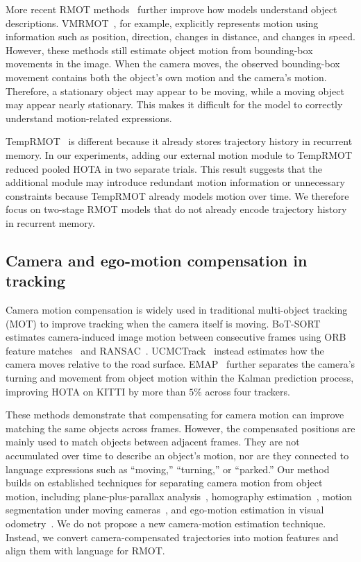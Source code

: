 \documentclass[sigconf,anonymous,nonacm]{acmart}
\begin{document}
More recent RMOT methods~\cite{mlstrack,deeprmot,cdrmot,tellmewhat} further improve how models understand object descriptions. VMRMOT~\cite{vmrmot}, for example, explicitly represents motion using information such as position, direction, changes in distance, and changes in speed. However, these methods still estimate object motion from bounding-box movements in the image. When the camera moves, the observed bounding-box movement contains both the object’s own motion and the camera’s motion. Therefore, a stationary object may appear to be moving, while a moving object may appear nearly stationary. This makes it difficult for the model to correctly understand motion-related expressions.

TempRMOT~\cite{temprmot} is different because it already stores trajectory history in recurrent memory. In our experiments, adding our external motion module to TempRMOT reduced pooled HOTA in two separate trials. This result suggests that the additional module may introduce redundant motion information or unnecessary constraints because TempRMOT already models motion over time. We therefore focus on two-stage RMOT models that do not already encode trajectory history in recurrent memory.

\subsection{Camera and ego-motion compensation in tracking}

Camera motion compensation is widely used in traditional multi-object tracking (MOT) to improve tracking when the camera itself is moving. BoT-SORT~\cite{botsort} estimates camera-induced image motion between consecutive frames using ORB feature matches~\cite{orb} and RANSAC~\cite{ransac}. UCMCTrack~\cite{ucmctrack} instead estimates how the camera moves relative to the road surface. EMAP~\cite{emap} further separates the camera's turning and movement from object motion within the Kalman prediction process, improving HOTA on KITTI by more than $5\%$ across four trackers.

These methods demonstrate that compensating for camera motion can improve matching the same objects across frames. However, the compensated positions are mainly used to match objects between adjacent frames. They are not accumulated over time to describe an object's motion, nor are they connected to language expressions such as ``moving,'' ``turning,'' or ``parked.'' Our method builds on established techniques for separating camera motion from object motion, including plane-plus-parallax analysis~\cite{iranianandan}, homography estimation~\cite{hartleyzisserman}, motion segmentation under moving cameras~\cite{bideau}, and ego-motion estimation in visual odometry~\cite{scaramuzza}. We do not propose a new camera-motion estimation technique. Instead, we convert camera-compensated trajectories into motion features and align them with language for RMOT.
\end{document}
